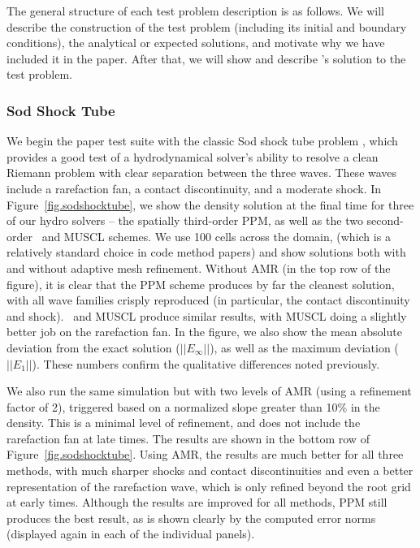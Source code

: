 The general structure of each test problem description is as follows.
We will describe the construction of the test problem (including its
initial and boundary conditions), the analytical or expected
solutions, and motivate why we have included it in the paper.  After
that, we will show and describe \enzo's solution to the test problem.


\subsubsection{Sod Shock Tube}
\label{sec.tests.sodshock}


We begin the paper test suite with the classic Sod shock tube problem
\citep{Sod78}, which provides a good test of a hydrodynamical solver's
ability to resolve a clean Riemann problem with clear separation
between the three waves.  These waves include a rarefaction fan, a
contact discontinuity, and a moderate shock.  In
Figure~\ref{fig.sodshocktube}, we show the density solution at the
final time for three of our hydro solvers -- the spatially third-order
PPM, as well as the two second-order \zeus\ and MUSCL schemes.  We use
100 cells across the domain, (which is a relatively standard choice in
code method papers) and show solutions both with and without adaptive
mesh refinement.  Without AMR (in the top row of the figure), it is
clear that the PPM scheme produces by far the cleanest solution, with
all wave families crisply reproduced (in particular, the contact
discontinuity and shock).  \zeus\ and MUSCL produce similar results,
with MUSCL doing a slightly better job on the rarefaction fan.  In the
figure, we also show the mean absolute deviation from the exact
solution ($||E_\infty||$), as well as the maximum deviation
($||E_1||$).  These numbers confirm the qualitative differences noted
previously.

We also run the same simulation but with two levels of AMR (using a
refinement factor of 2), triggered based on a normalized slope greater
than 10\% in the density.  This is a minimal level of refinement, and
does not include the rarefaction fan at late times.  The results are
shown in the bottom row of Figure~\ref{fig.sodshocktube}.  Using AMR,
the results are much better for all three methods, with much sharper
shocks and contact discontinuities and even a better representation of
the rarefaction wave, which is only refined beyond the root grid at
early times.  Although the results are improved for all methods, PPM
still produces the best result, as is shown clearly by the computed
error norms (displayed again in each of the individual panels).


